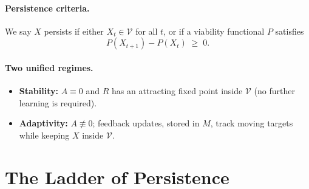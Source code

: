 \documentclass[a4paper,11pt]{article}
\begin{document}
\paragraph{Persistence criteria.}
We say $X$ persists if either $X_t \in \mathcal{V}$ for all $t$, or if a viability functional $P$ satisfies
\begin{equation}
P\!\left(X_{t+1}\right) - P\!\left(X_t\right) \;\ge\; 0.
\end{equation}

\paragraph{Two unified regimes.}
\begin{itemize}
  \item \textbf{Stability:} $A \equiv 0$ and $R$ has an attracting fixed point inside $\mathcal{V}$ (no further learning is required).
  \item \textbf{Adaptivity:} $A \not\equiv 0$; feedback updates, stored in $M$, track moving targets while keeping $X$ inside $\mathcal{V}$.
\end{itemize}

\section{The Ladder of Persistence}
\end{document}
